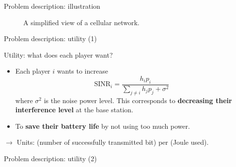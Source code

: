 \begin{frame}{Problem description: illustration}
    \begin{figure}
        \centering
        \caption{A simplified view of a cellular network.}
    \end{figure}
\end{frame}

\begin{frame}{Problem description: utility (1)}
    \begin{exampleblock}{Utility: what does each player want?}
        \begin{itemize}
            \item Each player $i$ wants to increase
            \[ \text{SINR}_i = \frac{h_ip_i}{\sum_{j\neq i} h_jp_j + \sigma^2} \]
            where $\sigma^2$ is the noise power level. This corresponds to
            \textbf{decreasing their interference level} at the base station.
            \item To \textbf{save their battery life} by not using too much power.
        \end{itemize}
    \end{exampleblock}

    \vspace{0.5cm}
    $\to$ Units: (number of successfully transmitted bit) per (Joule used).
\end{frame}

\begin{frame}{Problem description: utility (2)}
\end{frame}

